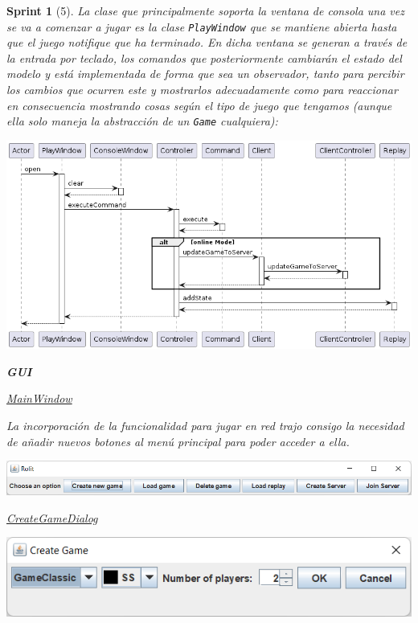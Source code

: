 \documentclass[12pt,a4paper,openright]{book}
\theoremstyle{break}
\newtheorem*{sprint}{Sprint}
\begin{document}
\begin{sprint}[5]
La clase que principalmente soporta la ventana de consola una vez se va a comenzar a jugar es la clase \texttt{PlayWindow} que se mantiene abierta hasta que el juego notifique que ha terminado. En dicha ventana se generan a través de la entrada por teclado, los comandos que posteriormente cambiarán el estado del modelo y está implementada de forma que sea un observador, tanto para percibir los cambios que ocurren este y mostrarlos adecuadamente como para reaccionar en consecuencia mostrando cosas según el tipo de juego que tengamos (aunque ella solo maneja la abstracción de un \texttt{Game} cualquiera):
\begin{center}
\includegraphics[scale=0.5]{PlayWindow_sprint5_seq}
\end{center}

\textbf{GUI}

\underline{MainWindow}

La incorporación de la funcionalidad para jugar en red trajo consigo  la necesidad de añadir nuevos botones al menú principal para poder acceder a ella.

\begin{center}
\includegraphics[scale=0.6]{menu-sprint5.png}
\end{center}

\underline{CreateGameDialog}

\begin{center}
\includegraphics[scale=0.8]{create-game-sprint5.png}
\end{center}


\end{sprint}
\end{document}
